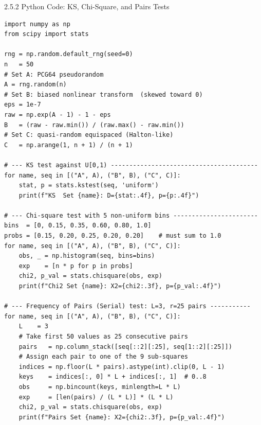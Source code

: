 \documentclass[aspectratio=169,10pt]{beamer}
\begin{document}
\begin{frame}[fragile]{2.5.2 Python Code: KS, Chi-Square, and Pairs Tests}

\begin{lstlisting}[style=python]
import numpy as np
from scipy import stats

rng = np.random.default_rng(seed=0)
n   = 50
# Set A: PCG64 pseudorandom
A = rng.random(n)
# Set B: biased nonlinear transform  (skewed toward 0)
eps = 1e-7
raw = np.exp(A - 1) - 1 - eps
B   = (raw - raw.min()) / (raw.max() - raw.min())
# Set C: quasi-random equispaced (Halton-like)
C   = np.arange(1, n + 1) / (n + 1)

# --- KS test against U[0,1) ----------------------------------------
for name, seq in [("A", A), ("B", B), ("C", C)]:
    stat, p = stats.kstest(seq, 'uniform')
    print(f"KS  Set {name}: D={stat:.4f}, p={p:.4f}")

# --- Chi-square test with 5 non-uniform bins -----------------------
bins  = [0, 0.15, 0.35, 0.60, 0.80, 1.0]
probs = [0.15, 0.20, 0.25, 0.20, 0.20]    # must sum to 1.0
for name, seq in [("A", A), ("B", B), ("C", C)]:
    obs, _ = np.histogram(seq, bins=bins)
    exp    = [n * p for p in probs]
    chi2, p_val = stats.chisquare(obs, exp)
    print(f"Chi2 Set {name}: X2={chi2:.3f}, p={p_val:.4f}")

# --- Frequency of Pairs (Serial) test: L=3, r=25 pairs -----------
for name, seq in [("A", A), ("B", B), ("C", C)]:
    L    = 3
    # Take first 50 values as 25 consecutive pairs
    pairs   = np.column_stack([seq[::2][:25], seq[1::2][:25]])
    # Assign each pair to one of the 9 sub-squares
    indices = np.floor(L * pairs).astype(int).clip(0, L - 1)
    keys    = indices[:, 0] * L + indices[:, 1]  # 0..8
    obs     = np.bincount(keys, minlength=L * L)
    exp     = [len(pairs) / (L * L)] * (L * L)
    chi2, p_val = stats.chisquare(obs, exp)
    print(f"Pairs Set {name}: X2={chi2:.3f}, p={p_val:.4f}")
\end{lstlisting}

\end{frame}
\end{document}
